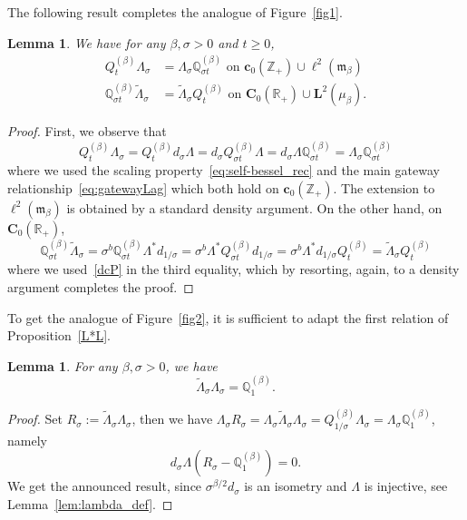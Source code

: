 \documentclass[10pt]{amsart}
\newtheorem{lemm}[theo]{Lemma}\newtheorem{prop}[theo]{Proposition}\newtheorem{coro}[theo]{Corollary}\newtheorem{conj}[theo]{Conjecture}
\theoremstyle{definition}\newtheorem{defi}[theo]{Definition}\newtheorem{rema}[theo]{Remark}\newtheorem{exam}[theo]{Example}\newtheorem{exem}[theo]{Example}\newtheorem{nota}[theo]{Notation}
\newcommand{\df}{\mathrel{:=}}
\newcommand{\RR}{\mathbb{R}}
\newcommand{\ZZ}{\mathbb{Z}}
\newcommand{\fm}{\mathfrak{m}}
\newcommand{\wi}{\widetilde}
\newcommand{\dBs}{{\discret{Q}}}
\newcommand{\Bs}{Q}
\newcommand{\esL}{\mathbf{L}}
\newcommand{\esC}{\mathbf{C}}
\newcommand{\esc}{\mathbf{c}}
\newcommand{\discret}[1]{\mathds{#1}}
\newcommand{\cont}[1]{{#1}}
\newcommand{\adjL}{\Lambda^*}
\begin{document}
The following result completes the analogue of Figure~\ref{fig1}.
\begin{lemm}\label{cinter}
We have for any $\beta,\sigma>0$ and $t\geq 0$,
\begin{align*}
\Bs_t^{(\beta)}\Lambda_{\sigma}&=\Lambda_{\sigma} \dBs_{\sigma t}^{(\beta)} \text{ on $\esc_0(\ZZ_+) \cup \ell^2({\fm_{\beta}})$}\\
\dBs_{\sigma t}^{(\beta)}\wi\Lambda_{\sigma}&=\wi\Lambda_{\sigma} \Bs_{t}^{(\beta)} \text{ on $\esC_0(\RR_+) \cup \esL^2(\mu_\beta)$}.
\end{align*}
\end{lemm}
\begin{proof}
First, we observe that
\[
\Bs_t^{(\beta)}\Lambda_{\sigma}=\Bs_t^{(\beta)} d_\sigma \Lambda=d_\sigma \Bs_{\sigma t}^{(\beta)} \Lambda=d_\sigma \Lambda \dBs_{\sigma t}^{(\beta)} =\Lambda_{\sigma} \dBs_{\sigma t}^{(\beta)}
\]
where we used the scaling property~\eqref{eq:self-bessel_rec} and the main gateway relationship~\eqref{eq:gatewayLag} which both hold on $\esc_0(\ZZ_+)$. The extension to $\ell^2({\fm_{\beta}})$ is obtained by a standard density argument. On the other hand, on $\esC_0(\RR_+)$,
\[
\dBs_{\sigma t}^{(\beta)}\wi\Lambda_{\sigma}=\sigma^b\dBs_{\sigma t}^{(\beta)}\adjL \cont{d}_{1/\sigma}=\sigma^b\adjL \Bs_{\sigma t}^{(\beta)} \cont{d}_{1/\sigma}=\sigma^b\adjL \cont{d}_{1/\sigma} \Bs_{t}^{(\beta)}=\wi\Lambda_{\sigma} \Bs_{t}^{(\beta)}
\]
where we used~\eqref{dcP} in the third equality, which by resorting, again, to a density argument completes the proof.
\end{proof}

To get the analogue of Figure~\ref{fig2}, it is sufficient to adapt the first relation of Proposition~\ref{L*L}.
\begin{lemm}\label{LcLc}
For any $\beta,\sigma>0$, we have
\[
\wi\Lambda_{\sigma}\Lambda_{\sigma}=\dBs^{(\beta)}_{1}.
\]
\end{lemm}
\begin{proof}
Set $R_{\sigma}\df \wi\Lambda_{\sigma}\Lambda_{\sigma}$, then we have $\Lambda_{\sigma}R_{\sigma}=\Lambda_{\sigma}\wi\Lambda_{\sigma}\Lambda_{\sigma}=\Bs_{1/\sigma}^{(\beta)}\Lambda_{\sigma}=\Lambda_{\sigma} \dBs_{1}^{(\beta)}$, namely
\[
d_\sigma\Lambda(R_{\sigma}-\dBs_{1}^{(\beta)})=0.
\]
We get the announced result, since $\sigma^{\beta/2}d_\sigma$ is an isometry and $\Lambda$ is injective, see Lemma~\ref{lem:lambda_def}.
\end{proof}
\end{document}
